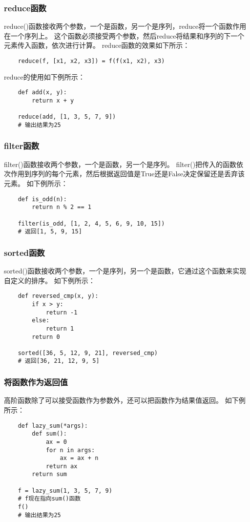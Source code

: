 \documentclass[a4paper,left=2.5cm,right=2.5cm,11pt]{article}
\begin{document}
\subsubsection{reduce函数}
	reduce()函数接收两个参数，一个是函数，另一个是序列，reduce将一个函数作用在一个序列上。
	这个函数必须接受两个参数，然后reduce将结果和序列的下一个元素传入函数，依次进行计算。
	reduce函数的效果如下所示：
	\begin{lstlisting}
	reduce(f, [x1, x2, x3]) = f(f(x1, x2), x3)
	\end{lstlisting}

	reduce的使用如下例所示：
	\begin{lstlisting}
	def add(x, y):
		return x + y

	reduce(add, [1, 3, 5, 7, 9])
	# 输出结果为25
	\end{lstlisting}

\subsubsection{filter函数}
	filter()函数接收两个参数，一个是函数，另一个是序列。
	filter()把传入的函数依次作用到序列的每个元素，然后根据返回值是True还是False决定保留还是丢弃该元素。
	如下例所示：
	\begin{lstlisting}
	def is_odd(n):
		return n % 2 == 1

	filter(is_odd, [1, 2, 4, 5, 6, 9, 10, 15])
	# 返回[1, 5, 9, 15]
	\end{lstlisting}

\subsubsection{sorted函数}
	sorted()函数接收两个参数，一个是序列，另一个是函数，它通过这个函数来实现自定义的排序。
	如下例所示：
	\begin{lstlisting}
	def reversed_cmp(x, y):
		if x > y:
			return -1
		else:
			return 1
		return 0

	sorted([36, 5, 12, 9, 21], reversed_cmp)
	# 返回[36, 21, 12, 9, 5]
	\end{lstlisting}

\subsubsection{将函数作为返回值}
	高阶函数除了可以接受函数作为参数外，还可以把函数作为结果值返回。
	如下例所示：
	\begin{lstlisting}
	def lazy_sum(*args):
		def sum():
			ax = 0
			for n in args:
				ax = ax + n
			return ax
		return sum

	f = lazy_sum(1, 3, 5, 7, 9)
	# f现在指向sum()函数
	f()
	# 输出结果为25
	\end{lstlisting}
\end{document}
